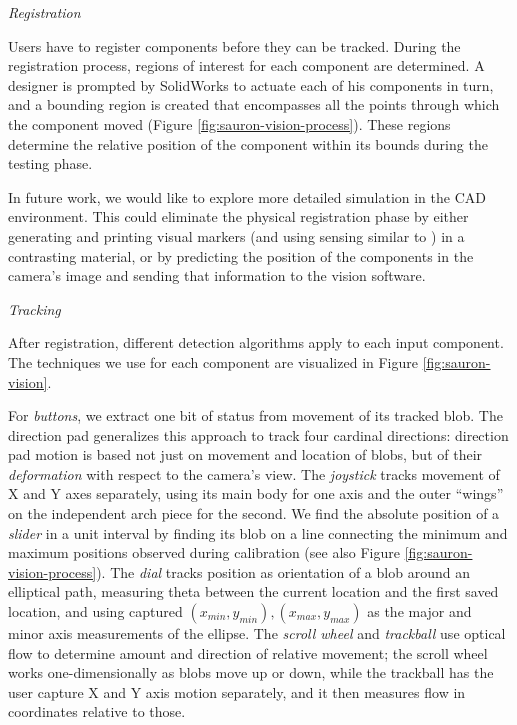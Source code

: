 \emph{Registration}

Users have to register components before they can be tracked. During the registration process, regions of interest for each component are determined. A designer is prompted by SolidWorks to actuate each of his components in turn, and a bounding region is created that encompasses all the points through which the component moved (Figure \ref{fig:sauron-vision-process}). These regions determine the relative position of the component within its bounds during the testing phase.

In future work, we would like to explore more detailed simulation in the CAD environment. This could eliminate the physical registration phase by either generating and printing visual markers (and using sensing similar to \cite{doering-composition}) in a contrasting material, or by predicting the position of the components in the camera's image and sending that information to the vision software.

\emph{Tracking}

After registration, different detection algorithms apply to each input component. The techniques we use for each component are visualized in Figure \ref{fig:sauron-vision}.

For {\em buttons}, we extract one bit of status from movement of its tracked blob. The direction pad generalizes this approach to track four cardinal directions: direction pad motion is based not just on movement and location of blobs, but of their \emph{deformation} with respect to the camera's view. The {\em joystick} tracks movement of X and Y axes separately, using its main body for one axis and the outer ``wings'' on the independent arch piece for the second. We find the absolute position of a {\em slider} in a unit interval by finding its blob on a line connecting the minimum and maximum positions observed during calibration (see also Figure \ref{fig:sauron-vision-process}). The {\em dial} tracks position as orientation of a blob around an elliptical path, measuring theta between the current location and the first saved location, and using captured $(x_{min}, y_{min}),(x_{max}, y_{max})$ as the major and minor axis measurements of the ellipse. The {\em scroll wheel} and {\em trackball} use optical flow to determine amount and direction of relative movement; the scroll wheel works one-dimensionally as blobs move up or down, while the trackball has the user capture X and Y axis motion separately, and it then measures flow in coordinates relative to those.

